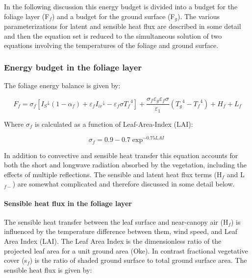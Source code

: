 In the following discussion this energy budget is divided into a budget for the foliage layer (F\(_{f}\)) and a budget for the ground surface (F\(_{g}\)). The various parameterizations for latent and sensible heat flux are described in some detail and then the equation set is reduced to the simultaneous solution of two equations involving the temperatures of the foliage and ground surface.

\subsubsection{Energy budget in the foliage layer}\label{energy-budget-in-the-foliage-layer}

The foliage energy balance is given by:

\begin{equation}
{F_f} = {\sigma_f}\left[ {{I_S}^ \downarrow (1 - {\alpha_f}) + {\varepsilon_f}{I_{ir}}^ \downarrow  - {\varepsilon_f}\sigma {T_f}^4} \right] + \frac{{{\sigma_f}{\varepsilon_g}{\varepsilon_f}\sigma }}{{{\varepsilon_1}}}\left( {{T_g}^4 - {T_f}^4} \right) + {H_f} + {L_f}
\end{equation}

Where $\sigma$\(_{f}\) is calculated as a function of Leaf-Area-Index (LAI):

\begin{equation}
\sigma_f = 0.9 - 0.7 \exp^{-0.75 LAI}
\end{equation}

In addition to convective and sensible heat transfer this equation accounts for both the short and longwave radiation absorbed by the vegetation, including the effects of multiple reflections. The sensible and latent heat flux terms (H\(_{f}\) and L\(_{f-}\)) are somewhat complicated and therefore discussed in some detail below.

\paragraph{Sensible heat flux in the foliage layer}\label{sensible-heat-flux-in-the-foliage-layer}

The sensible heat transfer between the leaf surface and near-canopy air (H\(_{f}\)) is influenced by the temperature difference between them, wind speed, and Leaf Area Index (LAI). The Leaf Area Index is the dimensionless ratio of the projected leaf area for a unit ground area (Oke). In contrast fractional vegetative cover (s\(_{f}\)) is the ratio of shaded ground surface to total ground surface area. The sensible heat flux is given by:

